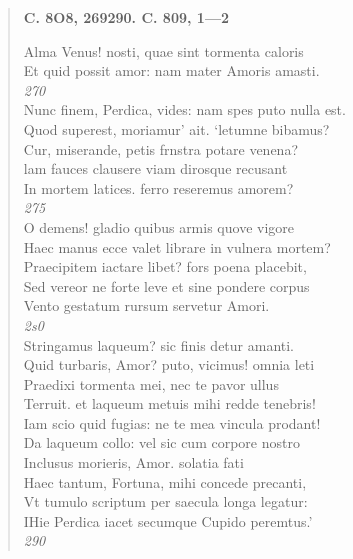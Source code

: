 \documentclass[11pt, a4paper]{report}
\begin{document}
\begin{verse}
    \begin{center} \textbf{C. 8O8, 269290. C. 809, 1—2} \end{center} \marginpar{[296]} Alma Venus! nosti, quae sint tormenta caloris \\ Et quid possit amor: nam mater Amoris amasti. \\ \textit{270} \\ Nunc finem, Perdica, vides: nam spes puto nulla est. \\ Quod superest, moriamur’  \lbrack ait. \rbrack  ‘letumne bibamus? \\ Cur, miserande, petis frnstra potare venena? \\ lam fauces clausere viam dirosque recusant \\ In mortem latices. ferro reseremus amorem? \\ \textit{275} \\ O demens! gladio quibus armis quove vigore \\ Haec manus ecce valet librare in vulnera mortem? \\ Praecipitem iactare libet? fors poena placebit, \\ Sed vereor ne forte leve et sine pondere corpus \\ Vento gestatum rursum servetur Amori. \\ \textit{2s0} \\ Stringamus laqueum? sic finis detur amanti. \\ Quid turbaris, Amor? puto, vicimus! omnia leti \\ Praedixi tormenta mei, nec te pavor ullus \\ Terruit. et laqueum metuis mihi redde tenebris! \\ Iam scio quid fugias: ne te mea vincula prodant! \\ Da laqueum collo: vel sic cum corpore nostro \\ Inclusus morieris, Amor. solatia fati \\ Haec tantum, Fortuna, mihi concede precanti, \\ Vt tumulo scriptum per saecula longa legatur: \\ IHie Perdica iacet secumque Cupido peremtus.’ \\ \textit{290} \\ 
      \end{verse}
  
\end{document}
